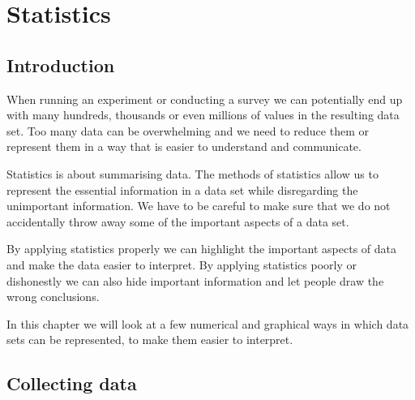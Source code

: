 \chapter{Statistics}

\section{Introduction}

When running an experiment or conducting a survey we can potentially
end up with many hundreds, thousands or even millions of values in the
resulting data set. Too many data can be overwhelming and we need to
reduce them or represent them in a way that is easier to understand
and communicate.

Statistics is about summarising data. The methods of statistics allow
us to represent the essential information in a data set while
disregarding the unimportant information. We have to be careful to
make sure that we do not accidentally throw away some of the important
aspects of a data set.



By applying statistics properly we can highlight the important aspects
of data and make the data easier to interpret. By applying statistics
poorly or dishonestly we can also hide important information and let
people draw the wrong conclusions.

In this chapter we will look at a few numerical and graphical ways in
which data sets can be represented, to make them easier to interpret.

\section{Collecting data}

